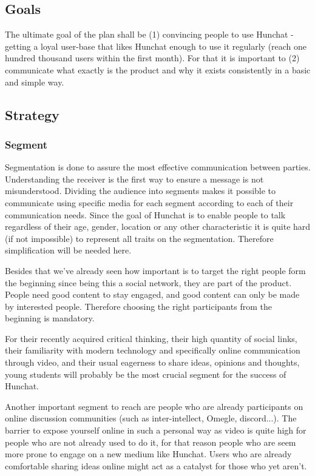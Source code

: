 \documentclass[12pt]{article}
\begin{document}
\subsection{Goals}
The ultimate goal of the plan shall be (1) convincing people to use Hunchat - getting a loyal user-base that likes Hunchat enough to use it regularly (reach one hundred thousand users within the first month).  For that it is important to (2) communicate what exactly is the product and why it exists consistently in a basic and simple way.

\subsection{Strategy}
\subsubsection{Segment}
Segmentation is done to assure the most effective communication between parties. Understanding the receiver is the first way to ensure a message is not misunderstood. Dividing the audience into segments makes it possible to communicate using specific media for each segment according to each of their communication needs. Since the goal of Hunchat is to enable people to talk regardless of their age, gender, location or any other characteristic it is quite hard (if not impossible) to represent all traits on the segmentation.  Therefore simplification will be needed here. 

Besides that we've already seen how important is to target the right people form the beginning since being this a social network, they are part of the product. People need good content to stay engaged, and good content can only be made by interested people. Therefore choosing the right participants from the beginning is mandatory.

For their recently acquired critical thinking, their high quantity of social links, their familiarity with modern technology and specifically online communication through video, and their usual eagerness to share ideas, opinions and thoughts, young students will probably be the most crucial segment for the success of Hunchat. 

Another important segment to reach are people who are already participants on online discussion communities (such as inter-intellect, Omegle, discord...). The barrier to expose yourself online in such a personal way as video is quite high for people who are not already used to do it, for that reason people who are seem more prone to engage on a new medium like Hunchat. Users who are already comfortable sharing ideas online might act as a catalyst for those who yet aren't. 
\end{document}
